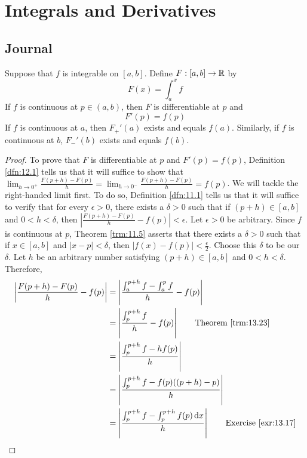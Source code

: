 \documentclass[../main.tex]{subfiles}
\begin{document}
\chapter{Integrals and Derivatives}\label{sct:14}
\section{Journal}
\begin{theorem}
    Suppose that $f$ is integrable on $[a,b]$. Define $F:[a,b]\to\mathbb{R}$ by
    \begin{equation*}
        F(x) = \int_a^xf
    \end{equation*}
    If $f$ is continuous at $p\in(a,b)$, then $F$ is differentiable at $p$ and
    \begin{equation*}
        F'(p) = f(p)
    \end{equation*}
    If $f$ is continuous at $a$, then $F_+'(a)$ exists and equals $f(a)$. Similarly, if $f$ is continuous at $b$, $F_-'(b)$ exists and equals $f(b)$.
    \begin{proof}
        To prove that $F$ is differentiable at $p$ and $F'(p)=f(p)$, Definition \ref{dfn:12.1} tells us that it will suffice to show that $\lim_{h\to 0^+}\frac{F(p+h)-F(p)}{h}=\lim_{h\to 0^-}\frac{F(p+h)-F(p)}{h}=f(p)$. We will tackle the right-handed limit first. To do so, Definition \ref{dfn:11.1} tells us that it will suffice to verify that for every $\epsilon>0$, there exists a $\delta>0$ such that if $(p+h)\in[a,b]$ and $0<h<\delta$, then $|\frac{F(p+h)-F(p)}{h}-f(p)|<\epsilon$. Let $\epsilon>0$ be arbitrary. Since $f$ is continuous at $p$, Theorem \ref{trm:11.5} asserts that there exists a $\delta>0$ such that if $x\in[a,b]$ and $|x-p|<\delta$, then $|f(x)-f(p)|<\frac{\epsilon}{2}$. Choose this $\delta$ to be our $\delta$. Let $h$ be an arbitrary number satisfying $(p+h)\in[a,b]$ and $0<h<\delta$. Therefore,
        \begingroup
        \allowdisplaybreaks
        \begin{align*}
            \left| \frac{F(p+h)-F(p)}{h}-f(p) \right| &= \left| \frac{\int_a^{p+h}f-\int_a^pf}{h}-f(p) \right|\\
            &= \left| \frac{\int_p^{p+h}f}{h}-f(p) \right|\tag*{Theorem \ref{trm:13.23}}\\
            &= \left| \frac{\int_p^{p+h}f-hf(p)}{h} \right|\\
            &= \left| \frac{\int_p^{p+h}f-f(p)((p+h)-p)}{h} \right|\\
            &= \left| \frac{\int_p^{p+h}f-\int_p^{p+h}f(p)\dd{x}}{h} \right|\tag*{Exercise \ref{exr:13.17}}\\

\end{align*}
\end{proof}
\end{theorem}
\end{document}
